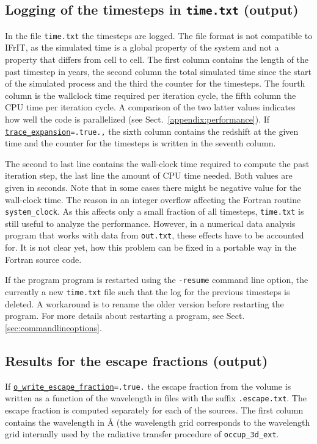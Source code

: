 \documentclass[a4paper,10pt]{article}
\begin{document}
\subsection{Logging of the timesteps in \texttt{time.txt} (output)}
\label{file:time}
In the file \texttt{time.txt} the timesteps are logged. The file format is not  
compatible to IFrIT, as the simulated time is a global property of the system 
and not a property that differs from cell to cell. The first column contains 
the length of the past timestep in years, the second column the total simulated 
time since the start of the simulated process and the third the counter for the 
timesteps. 
The fourth column is the wallclock time required per iteration cycle, the fifth 
column the CPU time per iteration cycle. A comparison of the two latter values 
indicates how well the code is parallelized (see 
Sect.~\ref{appendix:performance}).
If  
\texttt{\hyperref[opt:traceexpansion]{trace\_expansion}=.true.,} the sixth 
column contains the redshift at the given time and the counter for the 
timesteps is written in the seventh column.  

The second to last line contains the wall-clock time required to compute the 
past iteration step, the last line the amount of CPU time needed. Both values 
are given in seconds. Note that in some cases there might be negative value for 
the wall-clock time. The reason in an integer overflow affecting the Fortran 
routine \texttt{system\_clock}. As this affects only a small fraction of all 
timesteps, \texttt{time.txt} is still useful to analyze the performance. 
However, in a numerical data analysis program that works with data from 
\texttt{out.txt}, these effects have to be accounted for. It is not clear yet, 
how this problem can be fixed in a portable way  in the Fortran source code.

If the program program is restarted using the \texttt{-resume} command line  
option, the currently a new \texttt{time.txt} file such that the log for the 
previous timesteps is deleted. A workaround is to rename the older version 
before restarting the program. For more details about restarting a program, see 
Sect. \ref{sec:commandlineoptions}.

\subsection{Results for the escape fractions (output)}
If 
\texttt{\hyperref[opt:owriteescapefraction]{o\_write\_escape\_fraction}=.true.} 
the escape fraction from the volume is written as a function of the wavelength 
in files with the suffix \texttt{.escape.txt}. The escape fraction is computed 
separately for each of the sources. The first 
column contains the wavelength in \AA{} (the wavelength grid corresponds to the  
wavelength grid internally used by the radiative transfer procedure of 
\texttt{occup\_3d\_ext}.
\end{document}
